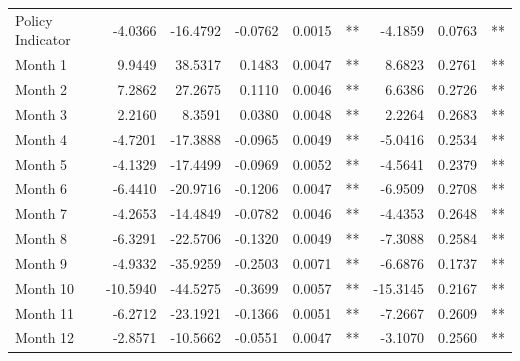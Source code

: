 \documentclass{cje}
\begin{document}
\begin{table}
\begin{tabular}{l r r r r l r r l}
Policy Indicator          &  -4.0366        &  -16.4792       &  -0.0762        &  0.0015       &   **       &  -4.1859        &  0.0763       &   **       \\ 
Month 1                         &  9.9449        &  38.5317       &  0.1483        &  0.0047       &   **       &  8.6823        &  0.2761       &   **       \\ 
Month 2                         &  7.2862        &  27.2675       &  0.1110        &  0.0046       &   **       &  6.6386        &  0.2726       &   **       \\ 
Month 3                         &  2.2160        &  8.3591       &  0.0380        &  0.0048       &   **       &  2.2264        &  0.2683       &   **       \\ 
Month 4                         &  -4.7201        &  -17.3888       &  -0.0965        &  0.0049       &   **       &  -5.0416        &  0.2534       &   **       \\ 
Month 5                         &  -4.1329        &  -17.4499       &  -0.0969        &  0.0052       &   **       &  -4.5641        &  0.2379       &   **       \\ 
Month 6                         &  -6.4410        &  -20.9716       &  -0.1206        &  0.0047       &   **       &  -6.9509        &  0.2708       &   **       \\ 
Month 7                         &  -4.2653        &  -14.4849       &  -0.0782        &  0.0046       &   **       &  -4.4353        &  0.2648       &   **       \\ 
Month 8                         &  -6.3291        &  -22.5706       &  -0.1320        &  0.0049       &   **       &  -7.3088        &  0.2584       &   **       \\ 
Month 9                         &  -4.9332        &  -35.9259       &  -0.2503        &  0.0071       &   **       &  -6.6876        &  0.1737       &   **       \\ 
Month 10                        &  -10.5940        &  -44.5275       &  -0.3699        &  0.0057       &   **       &  -15.3145        &  0.2167       &   **       \\ 
Month 11                        &  -6.2712        &  -23.1921       &  -0.1366        &  0.0051       &   **       &  -7.2667        &  0.2609       &   **       \\ 
Month 12                        &  -2.8571        &  -10.5662       &  -0.0551        &  0.0047       &   **       &  -3.1070        &  0.2560       &   **       \\ 


\end{tabular}
\end{table}
\end{document}
